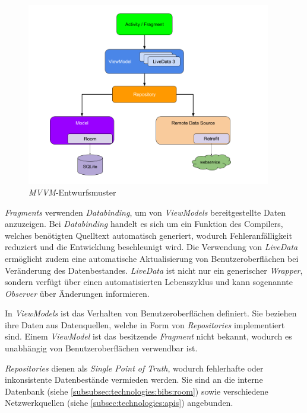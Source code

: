 \documentclass[a4paper]{article}
\begin{document}
\begin{figure}[H]
	\centering
	\includegraphics[height=8cm,keepaspectratio]{./images/mvvm-architecture.png}
	\caption{\textit{MVVM}-Entwurfsmuster \autocite{mvvm_architecture}}
	\label{fig:technologies:architecture:mvvm}
\end{figure}

\textit{Fragments} verwenden \textit{Databinding}, um von \textit{ViewModels} bereitgestellte Daten anzuzeigen.
Bei \textit{Databinding} handelt es sich um ein Funktion des Compilers, welches benötigten Quelltext automatisch generiert, wodurch Fehleranfälligkeit reduziert und die Entwicklung beschleunigt wird.
Die Verwendung von \textit{LiveData} ermöglicht zudem eine automatische Aktualisierung von Benutzeroberflächen bei Veränderung des Datenbestandes.
\textit{LiveData} ist nicht nur ein generischer \textit{Wrapper}, sondern verfügt über einen automatisierten Lebenszyklus und kann sogenannte \textit{Observer} über Änderungen informieren.

In \textit{ViewModels} ist das Verhalten von Benutzeroberflächen definiert.
Sie beziehen ihre Daten aus Datenquellen, welche in Form von \textit{Repositories} implementiert sind.
Einem \textit{ViewModel} ist das besitzende \textit{Fragment} nicht bekannt, wodurch es unabhängig von Benutzeroberflächen verwendbar ist.

\textit{Repositories} dienen als \textit{Single Point of Truth}, wodurch fehlerhafte oder inkonsistente Datenbestände vermieden werden.
Sie sind an die interne Datenbank (siehe \autoref{subsubsec:technologies:bibs:room}) sowie verschiedene Netzwerkquellen (siehe \autoref{subsec:technologies:apis}) angebunden.
\end{document}
